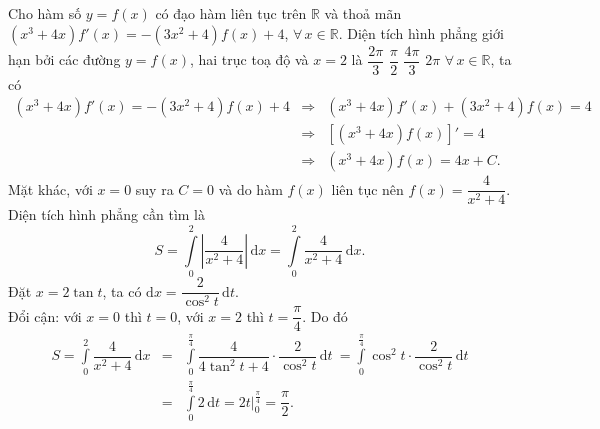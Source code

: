 \begin{ex}%
	Cho hàm số $y=f(x)$ có đạo hàm liên tục trên $\mathbb{R}$ và thoả mãn $\left( x^3+4x\right) f'(x)= -\left( 3x^2+4\right) f(x) +4$, $\forall\, x\in \mathbb{R}$. Diện tích hình phẳng giới hạn bởi các đường $y=f(x)$, hai trục toạ độ và $x=2$ là
	\choice
	{$\dfrac{2\pi}{3}$}
	{\True $\dfrac{\pi}{2}$}
	{$\dfrac{4\pi}{3}$}
	{$2\pi$}
	\loigiai
	{
		$\forall\, x\in \mathbb{R}$, ta có
		\begin{eqnarray*}
			\left( x^3+4x\right) f'(x)= -\left( 3x^2+4\right) f(x) +4 &\Rightarrow& \left( x^3+4x\right) f'(x)+ \left( 3x^2+4\right) f(x)= 4\\
			&\Rightarrow& \left[ \left( x^3+4x\right) f(x)\right]' = 4\\
			&\Rightarrow& \left( x^3+4x\right) f(x) = 4x+C.
		\end{eqnarray*}
		Mặt khác, với $x=0$ suy ra $C=0$ và do hàm $f(x)$ liên tục nên $f(x)= \dfrac{4}{x^2+4}$.\\
		Diện tích hình phẳng cần tìm là 
		\[
		S= \displaystyle\int\limits_0^2 \left| \dfrac{4}{x^2+4}\right| \mathrm{\, d}x =  \displaystyle\int\limits_0^2 \dfrac{4}{x^2+4} \mathrm{\, d}x.
		\]
		Đặt $x=2\tan t$, ta có $\mathrm{d}x= \dfrac{2}{\cos^2 t} \mathrm{\, d} t$.\\
		Đổi cận: với $x=0$ thì $t=0$, với $x=2$ thì $t=\dfrac{\pi}{4}$. Do đó
		\begin{eqnarray*}
			S=\displaystyle\int\limits_0^2 \dfrac{4}{x^2+4} \mathrm{\, d}x&=& \displaystyle\int\limits_0^{\tfrac{\pi}{4}} \dfrac{4}{4\tan^2 t+4} \cdot \dfrac{2}{\cos^2 t} \mathrm{\, d}t\ = \displaystyle\int\limits_0^{\tfrac{\pi}{4}} \cos^2 t \cdot \dfrac{2}{\cos^2 t} \mathrm{\, d}t\\
			&=& \displaystyle\int\limits_0^{\tfrac{\pi}{4}} 2 \mathrm{\, d} t = 2t\Big|_0^{\tfrac{\pi}{4}}= \dfrac{\pi}{2}.
		\end{eqnarray*}
	}
\end{ex}

